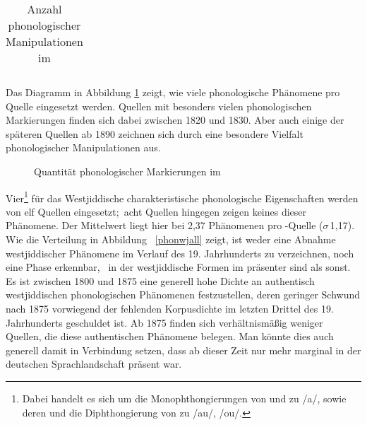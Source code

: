 {\begin{table}[p]
\begin{tabular}{lr}
  
  	
  \end{tabular} 
		 \caption{Anzahl phonologischer Manipulationen im }
		 \label{tblphonall}
		 \end{table}  
  


Das Diagramm in Abbildung \ref{phonall} zeigt, wie viele phonologische Phänomene pro Quelle eingesetzt werden. Quellen mit besonders vielen phonologischen Markierungen finden sich dabei zwischen 1820 und 1830. Aber auch einige der späteren Quellen ab 1890 zeichnen sich durch eine besondere Vielfalt phonologischer Manipulationen aus.
  
\begin{figure}[p]
	\caption{Quantität phonologischer Markierungen im }
	\label{phonall}	
\end{figure}
 
 \largerpage
 Vier\footnote{Dabei handelt es sich um die Monophthongierungen von  und  zu /a\textlengthmark/, sowie deren  und die Diphthongierung von  zu /au/, /ou/.} für das Westjiddische charakteristische phonologische Eigenschaften werden von elf Quellen eingesetzt;\, acht Quellen hingegen zeigen keines dieser Phänomene. Der Mittelwert liegt hier bei 2,37  Phänomenen  pro -Quelle ({$\sigma$}\,1,17). Wie die Verteilung in Abbildung \,%
 \ref{phonwjall} zeigt, ist weder eine Abnahme westjiddischer Phänomene im Verlauf des 19. Jahrhunderts zu verzeichnen, noch eine Phase erkennbar, \,%
 in der westjiddische Formen im  präsenter sind als sonst. Es ist zwischen 1800 und 1875 eine generell hohe Dichte an authentisch westjiddischen phonologischen Phänomenen festzustellen, deren geringer Schwund nach 1875 vorwiegend der fehlenden Korpusdichte im letzten Drittel des 19. Jahrhunderts geschuldet ist. Ab 1875 finden sich verhältnismäßig weniger Quellen, die diese authentischen Phänomene belegen. Man könnte dies auch generell damit in Verbindung setzen, dass ab dieser Zeit  nur mehr marginal in der deutschen Sprachlandschaft präsent war.  
 
}
